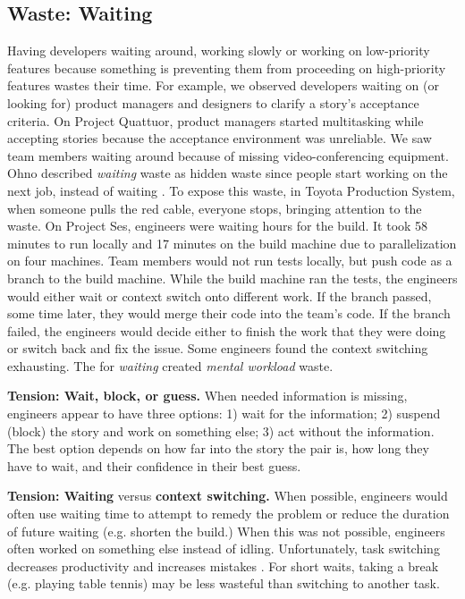 \subsection{Waste: Waiting}
Having developers waiting around, working slowly or working on low-priority features because something is preventing them from proceeding on high-priority features wastes their time. For example, we observed developers waiting on (or looking for) product managers and designers to clarify a story's acceptance criteria. On Project Quattuor, product managers started multitasking while accepting stories because the acceptance environment was unreliable. We saw team members waiting around because of missing video-conferencing equipment. 
Ohno described \textit{waiting} waste as hidden waste since people start working on the next job, instead of waiting \cite{OhnoToyotaProductionSystem}. To expose this waste, in Toyota Production System, when someone pulls the red cable, everyone stops, bringing attention to the waste. On Project Ses, engineers were waiting hours for the build. It took 58 minutes to run locally and 17 minutes on the build machine due to parallelization on four machines. Team members would not run tests locally, but push code as a branch to the build machine. While the build machine ran the tests, the engineers would either wait or context switch onto different work. If the branch passed, some time later, they would merge their code into the team's code. If the branch failed, the engineers would decide either to finish the work that they were doing or switch back and fix the issue. Some engineers found the context switching exhausting. The  for \textit{waiting} created \textit{mental workload} waste.

\textbf{Tension: Wait, block, or guess.}
When needed information is missing, engineers appear to have three options: 1) wait for the information; 2) suspend (block) the story and work on something else; 3) act without the information. The best option depends on how far into the story the pair is, how long they have to wait, and their confidence in their best guess.

\textbf{Tension: Waiting} versus \textbf{context switching.}
When possible, engineers would often use waiting time to attempt to remedy the problem or reduce the duration of future waiting (e.g. shorten the build.) When this was not possible, engineers often worked on something else instead of idling. Unfortunately, task switching decreases productivity and increases mistakes \cite{MonsellTaskSwitching}. For short waits, taking a break (e.g. playing table tennis) may be less wasteful than switching to another task. 


